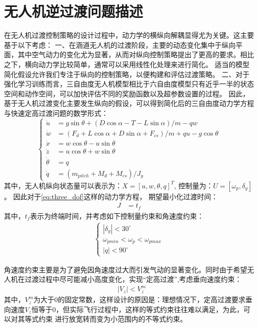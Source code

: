 \section{无人机逆过渡问题描述}
在无人机过渡控制策略的设计过程中，动力学的横纵向解耦显得尤为关键。这主要基于以下考虑：
一、在涵道无人机的过渡阶段，主要的动态变化集中于纵向平面，其中空气动力的变化尤为显著，从而对纵向控制策略提出了更高的要求。相比之下，横向动力学比较简单，通常可以采用线性化处理来进行简化。
适当的模型简化假设允许我们专注于纵向的控制策略，以便构建和评估过渡策略。
二、对于强化学习训练而言，三自由度无人机模型相比于六自由度模型只有近乎一半的状态空间和动作空间，可以加快评估不同的奖励函数以及超参数设置的过程。
因此，基于无人机过渡变化主要发生纵向的假设，可以得到简化后的三自由度动力学方程与快速定高过渡问题的数学形式：
\begin{equation}
    \left\{
    \begin{aligned}
    \dot{u}&= g\sin \theta +\left (  D\cos \alpha -T-L\sin\alpha\right )/m -qw \\
    \dot{w}&= \left ( F_{d}+L\cos\alpha+D\sin\alpha +F_{cs} \right )/m+qu-g\cos\theta\\
    \dot{x}&= w\cos \theta-u\sin \theta \\
    \dot{z}&= u\cos \theta+w\sin \theta \\
    \dot{\theta}&=q\\
    \dot{q}&=\left ( m_{pitch} + M_{d} + M_{cs} \right ) /J_{y}
    \label{eq:three_dof}
    \end{aligned}
    \right.
\end{equation}
其中，无人机纵向状态量可以表示为：$X=\left [ u,w,\theta,q \right ]^{T}$, 控制量为：$U=[\omega _{p},\delta_{y}]$。
因此对于\autoref{eq:three_dof}这样的动力学方程，
期望最小化过渡时间：
\begin{align}
    J & = t_{f}
\end{align}
其中，$t_{f}$表示为终端时间，并考虑如下控制量约束和角速度约束：
\begin{align}
    \left\{\begin{matrix}
        \left | \delta _{y} \right |<30^{\circ}\\
        \omega _{pmin}<\omega _{p}<\omega _{pmax}\\
        \left | q \right |<90^{\circ}
    \end{matrix}\right.
\end{align}

角速度约束主要是为了避免因角速度过大而引发气动的显著变化。同时由于希望无人机在过渡过程中尽可能减小高度变化，实现“定高过渡”\cite{cheng2022transition},考虑垂向速度约束：
\begin{align}
    &\left | V_{z} \right |<V_{z}^{m}
\end{align}
其中，$V_{z}^{m}$为大于0的固定常数，这样设计的原因是：理想情况下，定高过渡要求垂向速度$V_{z}$恒等于0，但实际飞行过程中，这样的等式约束往往难以满足，为此，可以对其等式约束
进行放宽转而变为小范围内的不等式约束。

